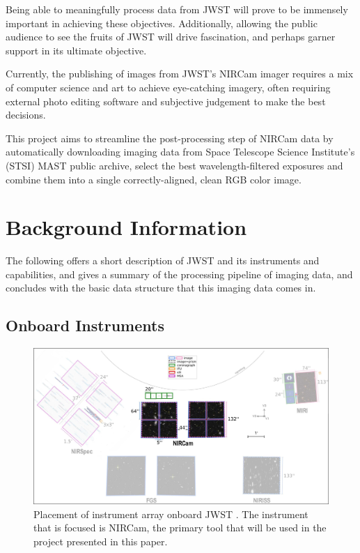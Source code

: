 \documentclass[10pt,twocolumn,letterpaper]{article}
\begin{document}
Being able to meaningfully process data from JWST will prove to be immensely important in achieving these objectives. Additionally, allowing the public audience to see the fruits of JWST will drive fascination, and perhaps garner support in its ultimate objective.

Currently, the publishing of images from JWST's NIRCam imager requires a mix of computer science and art to achieve eye-catching imagery, often requiring external photo editing software and subjective judgement to make the best decisions.

This project aims to streamline the post-processing step of NIRCam data by automatically downloading imaging data from Space Telescope Science Institute's (STSI) MAST public archive, select the best wavelength-filtered exposures and combine them into a single correctly-aligned, clean RGB color image.

\section{Background Information}
\label{sec:background}

The following offers a short description of JWST and its instruments and capabilities, and gives a summary of the processing pipeline of imaging data, and concludes with the basic data structure that this imaging data comes in.

\subsection{Onboard Instruments}

\begin{figure}
  \centering
    \includegraphics[scale=0.18]{instrument_array}
  \caption{Placement of instrument array onboard JWST \cite{webbnircam}. The instrument that is focused is NIRCam, the primary tool that will be used in the project presented in this paper.}
  \label{fig:instruments}
\end{figure}
\end{document}
